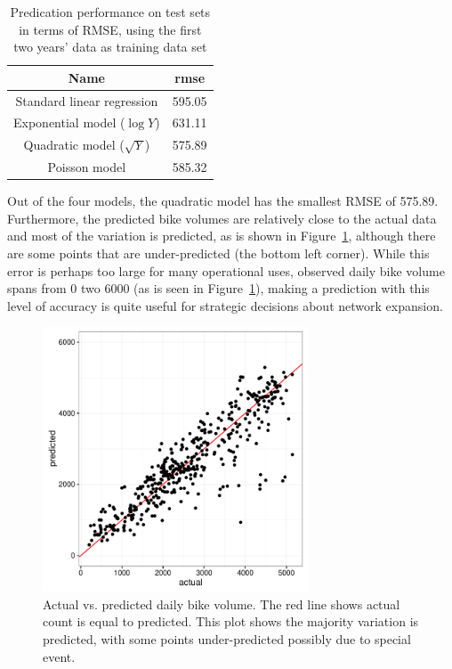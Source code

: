 \documentclass [11pt, proquest] {uwthesis}[2015/03/03]
\begin{document}
\begin{table}
 \centering 
  \label{tbl:pred4model} 
\small
\begin{tabular}{ c | c } 
\hline 
  Name & rmse \\ 
\hline
  Standard linear regression & 595.05  \\ 
  Exponential model ($\log{Y}$) & 631.11 \\ 
  Quadratic model ($\sqrt{Y}$) & 575.89\\ 
  Poisson model & 585.32 \\
\hline 
\end{tabular} 
\caption{Predication performance on test sets in terms of RMSE, using the first two years' data as training data set} 
\end{table} 


Out of the four models, the quadratic model has the smallest RMSE of 575.89. Furthermore, the predicted bike volumes are relatively close to the actual data and most of the variation is predicted, as is shown in Figure~\ref{fig:avpmodel0}, although there are some points that are under-predicted (the bottom left corner). While this error is perhaps too large for many operational uses, observed daily bike volume spans from 0 two 6000 (as is seen in Figure~\ref{fig:avpmodel0}), making a prediction with this level of accuracy is quite useful for strategic decisions about network expansion.
\begin{figure}
\centering
   \includegraphics[width=0.7\textwidth]{figures/actualvspred} 
  \caption{Actual vs. predicted daily bike volume. The red line shows actual count is equal to predicted. This plot shows the majority variation is predicted, with some points under-predicted possibly due to special event.}
  \label{fig:avpmodel0}
  \vspace{-.5in}
\end{figure}
\end{document}
